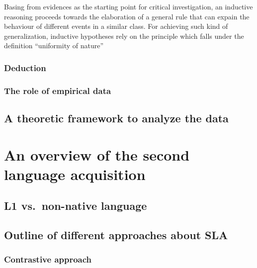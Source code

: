 \documentclass[
  a4paper,
  twoside,
  12pt,
  chapterprefix=false,
  bibliography=totocnumbered,
  listof=flat]{scrbook}
\begin{document}
Basing from evidences as the starting point for critical investigation, an inductive reasoning proceeds towards the elaboration of a general rule that can expain the behaviour of different events in a similar class. For achieving such kind of generalization, inductive hypotheses rely on the principle which falls under the definition ``uniformity of nature''

\hypertarget{deduction}{%
\subsection{Deduction}\label{deduction}}

\hypertarget{the-role-of-empirical-data}{%
\subsection{The role of empirical data}\label{the-role-of-empirical-data}}

\hypertarget{a-theoretic-framework-to-analyze-the-data}{%
\section{A theoretic framework to analyze the data}\label{a-theoretic-framework-to-analyze-the-data}}

\hypertarget{an-overview-of-the-second-language-acquisition}{%
\chapter{An overview of the second language acquisition}\label{an-overview-of-the-second-language-acquisition}}

\hypertarget{l1-vs.-non-native-language}{%
\section{L1 vs.~non-native language}\label{l1-vs.-non-native-language}}

\hypertarget{outline-of-different-approaches-about-sla}{%
\section{Outline of different approaches about SLA}\label{outline-of-different-approaches-about-sla}}

\hypertarget{contrastive-approach}{%
\subsection{Contrastive approach}\label{contrastive-approach}}
\end{document}
